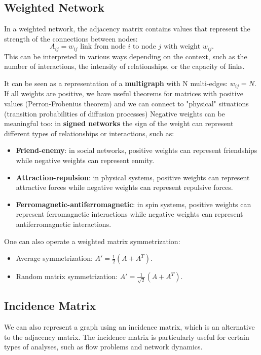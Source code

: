 \subsection{Weighted Network}

In a weighted network, the adjacency matrix contains values that represent the strength of the connections between nodes:
\[
    A_{ij} = w_{ij} \text{ link from node } i \text{ to node } j \text{ with weight } w_{ij}.
\]
This can be interpreted in various ways depending on the context, such as the number of interactions, the intensity of relationships, or the capacity of links.

It can be seen as a representation of a \textbf{multigraph} with N multi-edges: \(w_{ij} = N\). If all weights are positive, we have useful theorems for matrices with positive values (Perron-Frobenius theorem) and we can connect to "physical" situations (transition probabilities of diffusion processes)
Negative weights can be meaningful too: in \textbf{signed networks} the sign of the weight can represent different types of relationships or interactions, such as:
\begin{itemize}
    \item \textbf{Friend-enemy}: in social networks, positive weights can represent friendships while negative weights can represent enmity.
    \item \textbf{Attraction-repulsion}: in physical systems, positive weights can represent attractive forces while negative weights can represent repulsive forces.
    \item \textbf{Ferromagnetic-antiferromagnetic}: in spin systems, positive weights can represent ferromagnetic interactions while negative weights can represent antiferromagnetic interactions.
\end{itemize}

One can also operate a weighted matrix symmetrization:
\begin{itemize}
    \item Average symmetrization: $A' = \frac{1}{2}(A + A^T)$.
    \item Random matrix symmetrization: $A' = \frac{1}{\sqrt{2}}(A + A^T)$.
\end{itemize}

\subsection{Incidence Matrix}

We can also represent a graph using an incidence matrix, which is an alternative to the adjacency matrix. The incidence matrix is particularly useful for certain types of analyses, such as flow problems and network dynamics.

